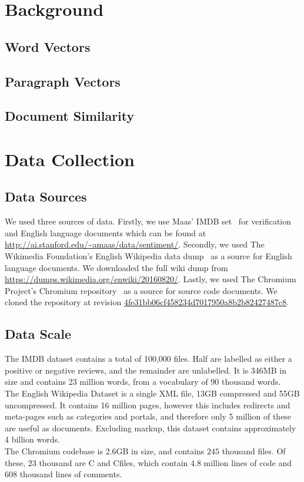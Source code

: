 \documentclass[11pt]{article}
\newcommand{\CPP}
{C\nolinebreak[4]\hspace{-.05em}\raisebox{.22ex}{\footnotesize\bf ++\ }}
\begin{document}
\section*{Background}

\subsection*{Word Vectors}

\subsection*{Paragraph Vectors}

\subsection*{Document Similarity}


\section*{Data Collection}

\subsection*{Data Sources}
We used three sources of data. Firstly, we use Maas' IMDB set~\cite{maas2011}
for verification and English language documents which can be found at
\url{http://ai.stanford.edu/~amaas/data/sentiment/}. Secondly, we used The
Wikimedia Foundation's English Wikipedia data dump~\cite{wikidatadump2016} as
a source for English language documents. We downloaded the full wiki dump from
\url{https://dumps.wikimedia.org/enwiki/20160820/}. Lastly, we used The
Chromium Project's Chromium repository~\cite{chromium2016} as a source for
source code documents. We cloned the repository at revision
\href{https://github.com/nwjs/chromium.src/commit/4fe31bb06cf458234d7017950a8b2b82427487c8}
{4fe31bb06cf458234d7017950a8b2b82427487c8}.

\subsection*{Data Scale}
The IMDB dataset contains a total of 100,000 files. Half are labelled as either a
positive or negative reviews, and the remainder are unlabelled. It is 346MB in size
and contains 23 million words, from a vocabulary of 90 thousand words.\\
The English Wikipedia Dataset is a single XML file, 13GB compressed and
55GB uncompressed. It contains 16 million pages, however this includes
redirects and meta-pages such as categories and portals, and therefore only
5 million of these are useful as documents. Excluding markup, this dataset contains
approximately 4 billion words.\\
The Chromium codebase is 2.6GB in size, and contains $245$ thousand files.
Of these, $23$ thousand are C and \CPP files, which contain $4.8$ million lines of
code and $608$ thousand lines of comments.
\end{document}
